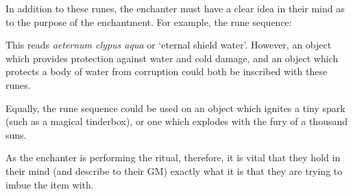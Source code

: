 In addition to these runes, the enchanter must have a clear idea in their mind as to the purpose of the enchantment. For example, the rune sequence:
\begin{center}
	\large \rune{\aeternum\clypus\aqua}
\end{center}
This reads {\it aeternum clypus aqua} \minus{} or `eternal shield water'. However, an object which provides protection against water and cold damage, and an object which protects a body of water from corruption could both be inscribed with these runes. 

Equally, the rune sequence  \rune{\displos\genero\ignis} could be used on an object which ignites a tiny spark (such as a magical tinderbox), or one which explodes with the fury of a thousand suns. 

As the enchanter is performing the ritual, therefore, it is vital that they hold in their mind (and describe to their GM) exactly what it is that they are trying to imbue the item with. 

\def\durText{The Duration runes specify how long the effect of the enchanted item lasts after it is activated: does it last for only a few seconds at a time, does it release the effect incredibly quickly then halt, or is the effect permanently active? }

\def\accText{The Action runes specifies the kind of action that the enchantment performs \minus{} does it create something new? Alter what is already present?  Does it give the user new abilities, or does it protect them from harm?}

\def\subText{The Subject runes control what the {\it Action} acts upon. Does the `creation' rune form a blast of fire or a jet of water? }

\newcommand\runeRow[3]
{
\rune{#2}	&#1	&		\small #3
\\
}

\newcommand\runeList[3]
{
\subsection{#1}

#2

\begin{center}

\begin{rndtable}{c l p {6 cm} }
\bf Rune	&	\bf Name	&	\bf Description
\\
#3
\end{rndtable}
\end{center}
}


